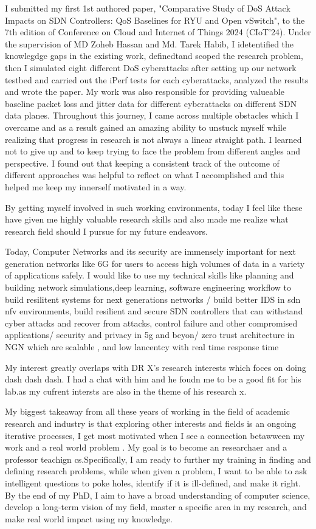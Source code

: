 \documentclass{article}
\begin{document}
I submitted my first 1st authored paper, "Comparative Study of DoS Attack Impacts on SDN Controllers: QoS Baselines for RYU and Open vSwitch",  to the 7th edition of Conference on Cloud and Internet of Things 2024 (CIoT’24). Under the supervision of MD Zoheb Hassan and Md. Tarek Habib, I idetentified the knowlegdge gaps in the existing work, definedtand scoped the research problem, then I simulated eight different DoS cyberattacks after setting up our network testbed and carried out the iPerf tests for each cyberattacks, analyzed the results and wrote the paper. My work was also responsible for providing valueable baseline packet loss and jitter data for different cyberattacks on different SDN data planes. Throughout this journey, I came across multiple obstacles which I overcame and as a result gained an amazing ability to unstuck myself while realizing that progress in research is not always a linear straight path. I learned not to give up and to keep trying to face the problem from different angles and perspective. I found out that keeping a consistent track of the outcome of different approaches was helpful to reflect on what I accomplished and this helped me keep my innerself motivated in a way.

By getting myself involved in such working environments, today I feel like these have given me highly valuable research skills and also made me realize what research field should I pursue for my future endeavors. 


Today, Computer Networks and its security are immensely important for next generation networks like 6G for users to access high volumes of data in a variety of applications safely. I would like to use my technical skills like planning and building network simulations,deep learning, software engineering workflow to build resilitent systems for next generations networks / build better IDS  in sdn nfv environments,  build resilient and secure SDN controllers that can withstand cyber attacks and recover from attacks, control failure  and other compromised applications/ security and privacy in 5g and beyon/ zero trust architecture in NGN which are scalable , and low lancentcy with real time response time

My interest greatly overlaps with DR X's research interests which foces on doing dash dash dash. I had a chat with him and he foudn me to be a good fit for his lab.as my cufrent intersts are also in the theme of his research x.

My biggest takeaway from all these years of working in the field of academic research and industry is that exploring other interests and fields is an ongoing iterative processes, I  get most motivated when I see a connection betawween my work and a real world problem . My goal is to become an researchaer and a professor teachign cs.Specifically, I am ready to further my training in finding and defining research problems, while when given a problem, I want to be able to ask intelligent questions to poke holes, identify if it is ill-defined, and make it right. By the end of my PhD, I aim to have a broad understanding of computer science, develop a long-term vision of my field, master a specific area in my research, and make real world impact using my knowledge.
\end{document}
